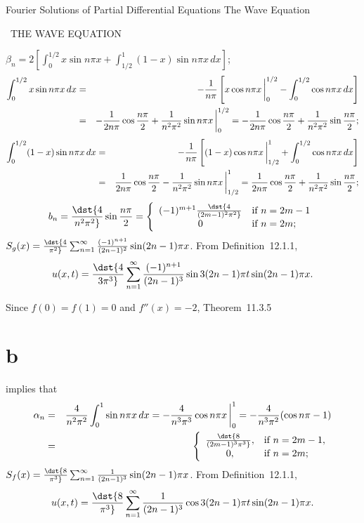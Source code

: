 \documentclass[dvips]{book}
\renewcommand{\exer}[1]{\par\medskip\;\noindent{\color{red}\bf #1.}}
\numberwithin{example}{section}
\numberwithin{equation}{section}
\numberwithin{theorem}{section}
\numberwithin{table}{section}
\numberwithin{figure}{section}
\newcommand{\lims}[2]{\,\bigg|_{#1}^{#2}}
\begin{document}
 {Fourier Solutions of Partial Differential Equations}
{The Wave Equation}

\renewcommand{\thissection}{\sectiontitle
{\, THE WAVE EQUATION}}
\thissection

\vspace*{-17.5pt}


\exer{12.2.1}
$\beta_n=2\left[\int_0^{1/2}x\sin n\pi x
+\int_{1/2}^1(1-x)\sin n\pi x\,dx\right]$;
\begin{eqnarray*}
\int_0^{1/2}x\sin n\pi x\,dx&=&-{1\over n\pi}\left[x\cos n\pi x
\lims0{1/2}-
\int_0^{1/2}\cos n\pi x\,dx\right]\\
&=&-{1\over2n\pi}\cos{n\pi\over2}+{1\over n^2\pi^2}\sin n\pi x
\lims0{1/2}
=-{1\over
2n\pi}\cos{n\pi\over2}+{1\over n^2\pi^2}\sin{n\pi\over2};
\end{eqnarray*}
\begin{eqnarray*}
\int_0^{1/2}(1-x)\sin n\pi x\,dx&=&-{1\over
n\pi}\left[(1-x)\cos n\pi x\lims{1/2}1+
\int_0^{1/2}\cos n\pi x\,dx\right]\\
&=&{1\over2n\pi}\cos{n\pi\over2}-{1\over n^2\pi^2}\sin n\pi x
\lims{1/2}1
={1\over
2n\pi}\cos{n\pi\over2}+{1\over n^2\pi^2}\sin{n\pi\over2};
\end{eqnarray*}
$$
b_n=\dst{4\over n^2\pi^2}\sin{n\pi\over2}=
\left\{\begin{array}{cl}
(-1)^{m+1}\dst{4\over(2m-1)^2\pi^2}&\mbox{if }n=2m-1\\
0&\mbox{if }n=2m;
\end{array}\right.
$$
$S_g(x)=\dst{4\over\pi^2}\sum_{n=1}^\infty
{(-1)^{n+1}\over(2n-1)^2}\sin(2n-1)\pi x$.
From Definition~12.1.1,
$$
u(x,t)=\dst{4\over3\pi^3}\sum_{n=1}^\infty
{(-1)^{n+1}\over(2n-1)^3}\sin3(2n-1)\pi t\sin(2n-1)\pi x.
$$



\exer{12.2.2}
Since $f(0)=f(1)=0$ and $f''(x)=-2$,
Theorem~11.3.5\part{b} implies that
\begin{eqnarray*}
\alpha_n&=&
{4\over n^2\pi^2}
\int_0^1\sin n\pi x\,dx
=-{4\over n^3\pi^3}\cos n\pi x\lims01=
-{4\over n^3\pi^2}(\cos n\pi-1)\\
&=&\left\{\begin{array}{cl}
\dst{8\over(2m-1)^3\pi^3},&\mbox{if $n=2m-1$},\\
0,&\mbox{if  $n=2m$};\\
\end{array}\right.
\end{eqnarray*}
$S_f(x)=\dst{8\over\pi^3}\sum_{n=1}^\infty{1\over(2n-1)^3}
\sin(2n-1)\pi x$.
From Definition~12.1.1,
$$
u(x,t)=\dst{8\over\pi^3}\sum_{n=1}^\infty{1\over(2n-1)^3}
\cos3(2n-1)\pi t\sin(2n-1)\pi x.
$$
\end{document}
